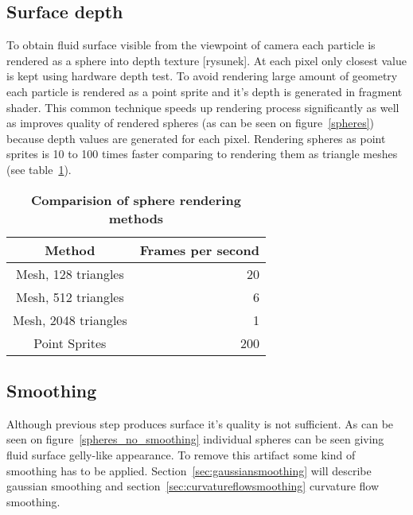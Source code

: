 \subsection{Surface depth} \label{sec:surfacedepth}
To obtain fluid surface visible from the viewpoint of camera each particle is rendered as a sphere into depth texture [rysunek]. At each pixel only closest value is kept using hardware depth test. 
To avoid rendering large amount of geometry each particle is rendered as a point sprite and it's depth is generated in fragment shader. This common technique speeds up rendering process significantly as well as improves quality of rendered spheres (as can be seen on figure~\ref{spheres}) because depth values are generated for each pixel. Rendering spheres as point sprites is 10 to 100 times faster comparing to rendering them as triangle meshes (see table~\ref{sphere_speed_comp}).
\begin{table}[htdp]
\caption[Comparision of sphere rendering methods]{\textbf{Comparision of sphere rendering methods}}
\centering
\begin{tabular}{cr} 
{\bf Method} & {\bf Frames per second} \\ 
\hline 
Mesh, 128 triangles & 20 \\
Mesh, 512 triangles & 6 \\
Mesh, 2048 triangles   & 1 \\
Point Sprites & 200 \\
\end{tabular}
\label{sphere_speed_comp}
\end{table}

\subsection{Smoothing} \label{sec:smoothing}
Although previous step produces surface it's quality is not sufficient. As can be seen on figure~\ref{spheres_no_smoothing} individual spheres can be seen giving fluid surface gelly-like appearance. To remove this artifact some kind of smoothing has to be applied. Section~\ref{sec:gaussiansmoothing} will describe gaussian smoothing and section~\ref{sec:curvatureflowsmoothing} curvature flow smoothing.

